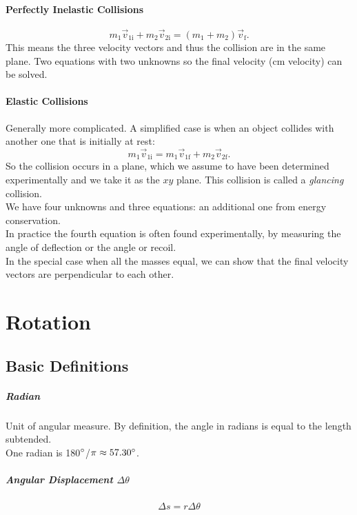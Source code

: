 \documentclass[11pt,letter]{report}
\begin{document}
\subsubsection{Perfectly Inelastic Collisions}
$$m_1 \vec{v}_{1\mathrm{i}} + m_2 \vec{v}_{2\mathrm{i}} = \left(m_1 + m_2\right) \vec{v}_\mathrm{f}.$$
This means the three velocity vectors and thus the collision are in the same plane. Two equations with two unknowns so the final velocity (cm velocity) can be solved.

\subsubsection{Elastic Collisions}
Generally more complicated. A simplified case is when an object collides with another one that is initially at rest: $$m_1 \vec{v}_{1\mathrm{i}} = m_1 \vec{v}_{1\mathrm{f}} + m_2 \vec{v}_{2\mathrm{f}}.$$
So the collision occurs in a plane, which we assume to have been determined experimentally and we take it as the $xy$ plane. This collision is called a \textit{glancing} collision.
\\We have four unknowns and three equations: an additional one from energy conservation.
\\In practice the fourth equation is often found experimentally, by measuring the angle of deflection or the angle or recoil.
\\In the special case when all the masses equal, we can show that the final velocity vectors are perpendicular to each other.

\chapter*{Rotation}
\section{Basic Definitions}
\paragraph{Radian}
Unit of angular measure. By definition, the angle in radians is equal to the length subtended.\\
One radian is 180$\degree$/$\pi \approx 57.30\degree$.

\paragraph{Angular Displacement $\Delta \theta$}
$$\Delta s = r\Delta \theta$$
\end{document}

